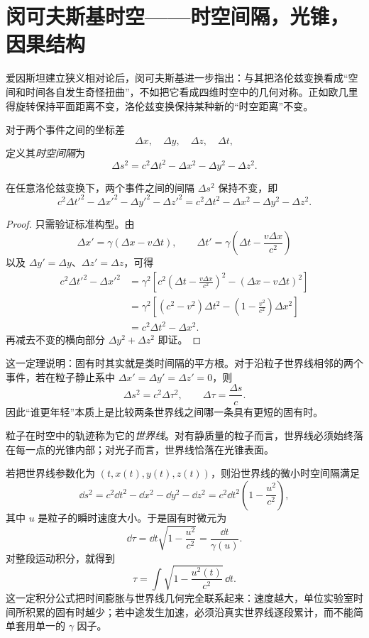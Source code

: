 \section{闵可夫斯基时空——时空间隔，光锥，因果结构}

爱因斯坦建立狭义相对论后，闵可夫斯基进一步指出：与其把洛伦兹变换看成“空间和时间各自发生奇怪扭曲”，不如把它看成四维时空中的几何对称。正如欧几里得旋转保持平面距离不变，洛伦兹变换保持某种新的“时空距离”不变。

\begin{definition}
对于两个事件之间的坐标差
\[
\Delta x,\quad \Delta y,\quad \Delta z,\quad \Delta t,
\]
定义其\emph{时空间隔}为
\[
\Delta s^2=c^2\Delta t^2-\Delta x^2-\Delta y^2-\Delta z^2.
\]
\end{definition}

\begin{theorem}[时空间隔不变]
在任意洛伦兹变换下，两个事件之间的间隔 $\Delta s^2$ 保持不变，即
\[
 c^2\Delta t'^2-\Delta x'^2-\Delta y'^2-\Delta z'^2
 =
 c^2\Delta t^2-\Delta x^2-\Delta y^2-\Delta z^2.
\]
\end{theorem}

\begin{proof}
只需验证标准构型。由
\[
\Delta x'=\gamma(\Delta x-v\Delta t),
\qquad
\Delta t'=\gamma\left(\Delta t-\frac{v\Delta x}{c^2}\right)
\]
以及 $\Delta y'=\Delta y$、$\Delta z'=\Delta z$，可得
\begin{align*}
 c^2\Delta t'^2-\Delta x'^2
 &=\gamma^2\left[c^2\left(\Delta t-\frac{v\Delta x}{c^2}\right)^2-(\Delta x-v\Delta t)^2\right] \\
 &=\gamma^2\left[(c^2-v^2)\Delta t^2-\left(1-\frac{v^2}{c^2}\right)\Delta x^2\right] \\
 &=c^2\Delta t^2-\Delta x^2.
\end{align*}
再减去不变的横向部分 $\Delta y^2+\Delta z^2$ 即证。
\end{proof}

这一定理说明：固有时其实就是类时间隔的平方根。对于沿粒子世界线相邻的两个事件，若在粒子静止系中 $\Delta x'=\Delta y'=\Delta z'=0$，则
\[
\Delta s^2=c^2\Delta \tau^2,
\qquad
\Delta \tau=\frac{\Delta s}{c}.
\]
因此“谁更年轻”本质上是比较两条世界线之间哪一条具有更短的固有时。

\begin{definition}
粒子在时空中的轨迹称为它的\emph{世界线}。对有静质量的粒子而言，世界线必须始终落在每一点的光锥内部；对光子而言，世界线恰落在光锥表面。
\end{definition}

若把世界线参数化为 $(t,x(t),y(t),z(t))$，则沿世界线的微小时空间隔满足
\[
\dd s^2=c^2\dd t^2-\dd x^2-\dd y^2-\dd z^2
=c^2\dd t^2\left(1-\frac{u^2}{c^2}\right),
\]
其中 $u$ 是粒子的瞬时速度大小。于是固有时微元为
\[
\dd \tau=\dd t\sqrt{1-\frac{u^2}{c^2}}=\frac{\dd t}{\gamma(u)}.
\]
对整段运动积分，就得到
\[
\tau=\int \sqrt{1-\frac{u^2(t)}{c^2}}\,\dd t.
\]
这一定积分公式把时间膨胀与世界线几何完全联系起来：速度越大，单位实验室时间所积累的固有时越少；若中途发生加速，必须沿真实世界线逐段累计，而不能简单套用单一的 $\gamma$ 因子。

